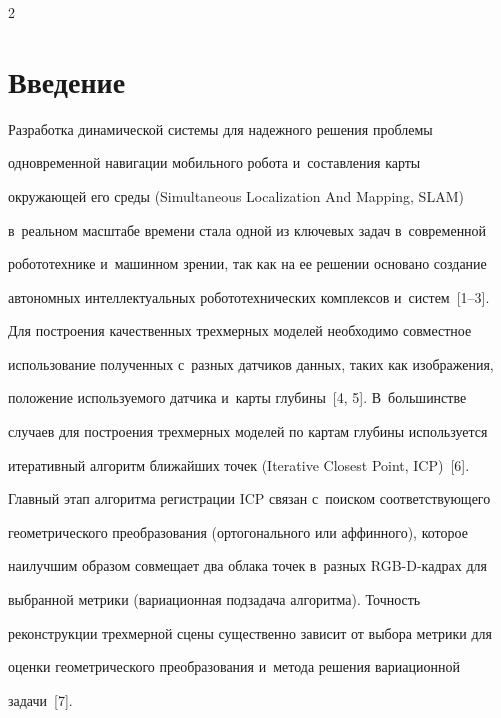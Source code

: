 \thispagestyle{headings}



\begin{multicols}{2}



\label{st\stat}

  

\section{Введение}



  Разработка динамической системы для надежного решения проблемы 

одновременной навигации мобильного робота и~составления карты 

окру\-жа\-ющей его среды (Simultaneous Localization And Mapping, SLAM) 

в~реальном масштабе времени стала одной из ключевых задач в~современной 

робототехнике и~машинном зрении, так как на ее решении основано создание 

автономных интеллектуальных робототехнических комплексов и~сис\-тем~[1--3]. 

Для построения качественных трехмерных моделей необходимо совместное 

использование полученных с~разных датчиков данных, таких как изображения, 

положение используемого датчика и~карты глубины~[4, 5]. В~большинстве 

случаев для построения трехмерных моделей по картам глубины используется 

итеративный алгоритм ближайших точек (Iterative Closest Point, ICP)~[6]. 

Главный этап алгоритма регистрации ICP связан с~поиском соответствующего 

геометрического преобразования (ортогонального или аффинного), которое 

наилучшим образом совмещает два облака точек в~разных RGB-D-кад\-рах для 

выбранной метрики (вариационная подзадача алгоритма). Точ\-ность 

реконструкции трехмерной сцены существенно зависит от выбора метрики для 

оценки гео\-мет\-ри\-че\-ско\-го преобразования и~метода решения вариационной 

задачи~[7]. 




\end{multicols}
